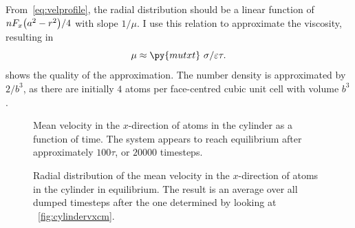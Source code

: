 \documentclass[11pt,british,a4paper]{report}
\begin{document}
From~\vref{eq:velprofile}, the radial distribution should be a linear function of \(nF_x\qty(a^2-r^2)/4\) with slope \(1/\mu\). I use this relation to approximate the viscosity, resulting in
\begin{equation}
    \mu \approx \py{mutxt}\ \sigma/\varepsilon\tau.
\end{equation}
 shows the quality of the approximation. The number density is approximated by \(2/b^3\), as there are initially \(4\) atoms per face-centred cubic unit cell with volume \(b^3\).
\begin{figure}[tbh]
    \centering
    \caption{Mean velocity in the \(x\)-direction of atoms in the cylinder as a function of time. The system appears to reach equilibrium after approximately \(100\tau\), or \(\num{20000}\) timesteps.}%
    \label{fig:cylindervxcm}
\end{figure}
\begin{figure}[tbh]
    \centering
    \caption{Radial distribution of the mean velocity in the \(x\)-direction of atoms in the cylinder in equilibrium. The result is an average over all dumped timesteps after the one determined by looking at ~\vref{fig:cylindervxcm}.}%
    \label{fig:cylindervx}
\end{figure}
\end{document}
